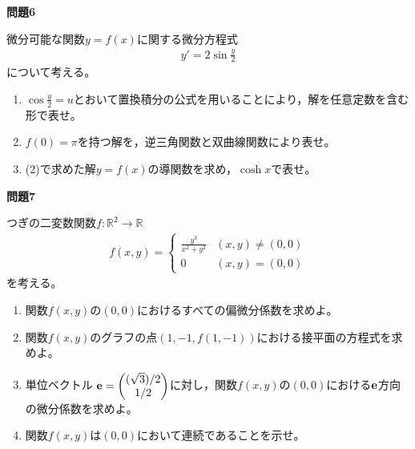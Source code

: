 \documentclass[a4paper,12pt,dvipdfmx,fleqn, oneside]{jsarticle}
\theoremstyle{defstyle}
\theoremstyle{thmx}
\theoremstyle{qesstyle}
\begin{document}
\begin{shadebox}
    \textbf{問題6}

    微分可能な関数$y=f(x)$に関する微分方程式
    \begin{align*}
        y'=2 \sin \frac{y}{2}
    \end{align*}
    について考える。
    \begin{enumerate}
        \item $\cos \frac{y}{2}=u$とおいて置換積分の公式を用いることにより，解を任意定数を含む形で表せ。
        \item $f(0)= \pi $を持つ解を，逆三角関数と双曲線関数により表せ。
        \item (2)で求めた解$y=f(x)$の導関数を求め，$\cosh x$で表せ。
    \end{enumerate}
\end{shadebox}
\begin{shadebox}
    \textbf{問題7}

    つぎの二変数関数$f: \mathbb{R}^2 \rightarrow \mathbb{R}$
    \begin{align*}
        f(x,y) =
        \begin{cases}
            \frac{y^3}{x^2+y^2} & (x,y) \neq (0,0) \\
            0                   & (x,y)= (0,0)
        \end{cases}
    \end{align*}
    を考える。
    \begin{enumerate}
        \item 関数$f(x,y)$の$(0,0)$におけるすべての偏微分係数を求めよ。
        \item 関数$f(x,y)$のグラフの点$(1,-1,f(1,-1))$における接平面の方程式を求めよ。
        \item 単位ベクトル $\bf{e}=
                  \begin{pmatrix}
                      (\sqrt{3})/2 \\
                      1/2
                  \end{pmatrix}$に対し，関数$f(x,y)$の$(0,0)$における$\bf{e}$方向の微分係数を求めよ。
        \item 関数$f(x,y)$は$(0,0)$において連続であることを示せ。
    \end{enumerate}
\end{shadebox}
\end{document}
